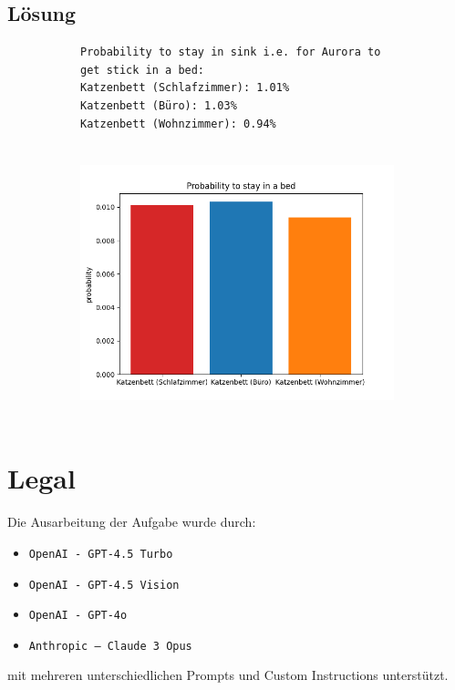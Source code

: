 \documentclass[a4paper,11pt]{report}
\begin{document}
    \section{Lösung}

    \begin{figure}[htbp]
        \centering
        \begin{subfigure}[b]{0.49\textwidth}
            \begin{verbatim}
Probability to stay in sink i.e. for Aurora to get stick in a bed:
Katzenbett (Schlafzimmer): 1.01%
Katzenbett (Büro): 1.03%
Katzenbett (Wohnzimmer): 0.94%
        \end{verbatim}
            \label{fig:a07_output}
        \end{subfigure}
        \begin{subfigure}[b]{0.49\textwidth}
            \includegraphics[height=8cm]{a07a_probability}
            \label{fig:a07_plot}
        \end{subfigure}
        \label{fig:a07_solution}
    \end{figure}


    \newpage

    \chapter{Legal}
    \label{ch:legal}
    Die Ausarbeitung der Aufgabe wurde durch:

    \begin{itemize}
        \item \texttt{OpenAI - GPT-4.5 Turbo}
        \item \texttt{OpenAI - GPT-4.5 Vision}
        \item \texttt{OpenAI - GPT-4o}
        \item \texttt{Anthropic -- Claude 3 Opus}
    \end{itemize}

    mit mehreren unterschiedlichen Prompts und Custom Instructions unterstützt.
\end{document}
